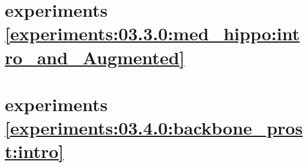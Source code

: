 \section{experiments \autoref{experiments:03.3.0:med_hippo:intro_and_Augmented}}


\newpage
\section{experiments \autoref{experiments:03.4.0:backbone_prost:intro}}


